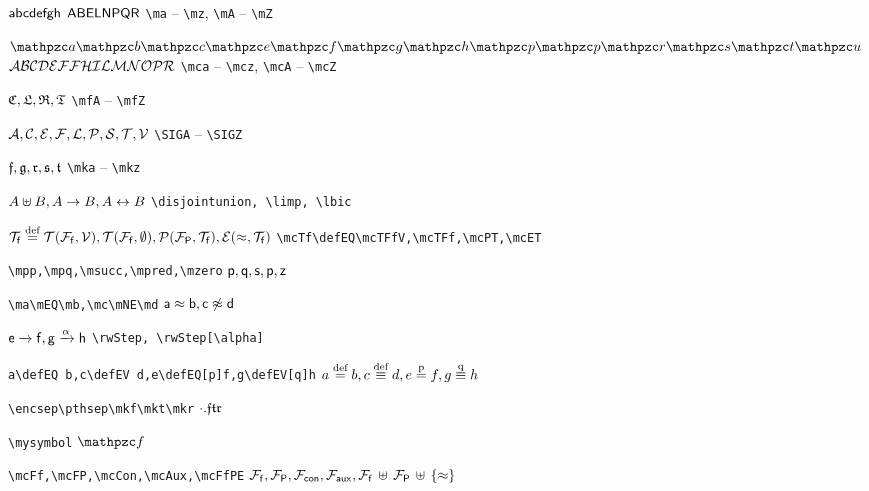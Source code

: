 
$\ma\mb\mc\md\me\mf\mg\mh$ $\mA\mB\mE\mL\mN\mP\mQ\mR$
\hfill 
\verb|\ma| -- \verb|\mz|, \verb|\mA| -- \verb|\mZ|

$\mca\mcb\mcc \mce\mcf\mcg\mch \mcp\mcq\mcr\mcs\mct\mcu$
$\mcA\mcB\mcC\mcD\mcE\mcF\mcG\mcH\mcI \mcL\mcM\mcN\mcO\mcP\mcR$
\hfill
\verb|\mca| -- \verb|\mcz|, \verb|\mcA| -- \verb|\mcZ|


$\mfC,\mfL,\mfR,\mfT$
\hfill
\verb|\mfA| -- \verb|\mfZ|


$\SIGA,\SIGC,\SIGE,\SIGF,\SIGL,\SIGP,\SIGS,\SIGT,\SIGV$
\hfill
\verb|\SIGA| -- \verb|\SIGZ|

$\mkf,\mkg,\mkr,\mks,\mkt$
\hfill
\verb|\mka| -- \verb|\mkz|

\vspace{1em}

$A\disjointunion B,A\limp B,A\lbic B$
\hfill 
\verb|\disjointunion, \limp, \lbic|


$\mcTf\defEQ\mcTFfV,\mcTFf,\mcPT,\mcET$
\hfill
\verb|\mcTf\defEQ\mcTFfV,\mcTFf,\mcPT,\mcET|

\verb|\mpp,\mpq,\msucc,\mpred,\mzero|
\hfill
$\mpp,\mpq,\msucc,\mpred,\mzero$

\verb|\ma\mEQ\mb,\mc\mNE\md|
\hfill
$\ma\mEQ\mb,\mc\mNE\md$

$\me\rwStep\mf, \mg\rwStep[\alpha]\mh$
\hfill
\verb|\rwStep, \rwStep[\alpha]|

\verb|a\defEQ b,c\defEV d,e\defEQ[p]f,g\defEV[q]h|
\hfill
$a\defEQ b,c\defEV d,e\defEQ[p]f,g\defEV[q]h$

\verb|\encsep\pthsep\mkf\mkt\mkr|
\hfill
$\encsep\pthsep\mkf\mkt\mkr$


\hfill



\hfill


\verb|\mysymbol|
\hfill
$\mysymbol$

\verb|\mcFf,\mcFP,\mcCon,\mcAux,\mcFfPE|
\hfill
$\mcFf,\mcFP,\mcCon,\mcAux,\mcFfPE$

%




